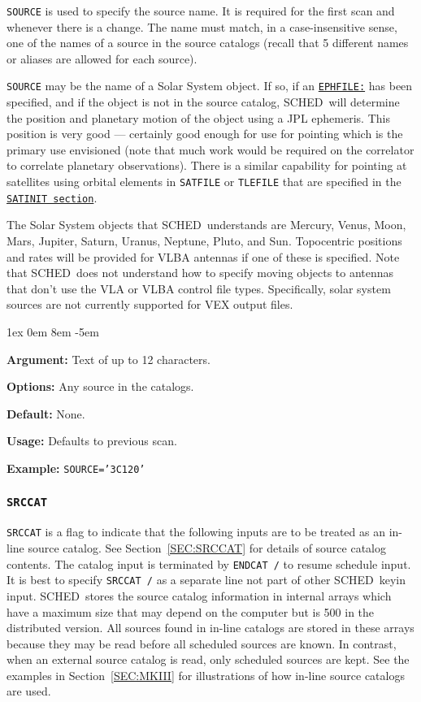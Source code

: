 \documentclass{report}
\newcommand{\schedb}{{\sc SCHED~}}
\newcommand{\rcwbox}[5]{
  \begin{list}{}{\parsep 1ex  \itemsep 0em
                 \leftmargin 8em  \itemindent -5em }
    \item {\bf Argument:} #1
    \item {\bf Options:}  #2
    \item {\bf Default:}  #3
    \item {\bf Usage:}    #4
    \item {\bf Example:}  #5
  \end{list}
}
\begin{document}
{\tt SOURCE} is used to specify the source name.  It is required for
the first scan and whenever there is a change. The name must match, in
a case-insensitive sense, one of the names of a source in the source
catalogs (recall that 5 different names or aliases are allowed for
each source).

{\tt SOURCE} may be the name of a Solar System object.  If so, if
an 
{\hyperref[MP:EPHFILE]{{\tt EPHFILE:}}} has been specified, and if the
object is not in the source catalog, \schedb will determine the position
and planetary motion of the object using a JPL ephemeris.  This position
is very good --- certainly good enough for use for pointing which
is the primary use envisioned (note that much work would be required
on the correlator to correlate planetary observations).  There is
a similar capability for pointing at satellites using orbital
elements in {\tt SATFILE} or {\tt TLEFILE} that are specified in the
{\hyperref[SEC:SATINIT]{{\tt SATINIT section}}}.

The Solar System objects that \schedb understands are Mercury, Venus,
Moon, Mars, Jupiter, Saturn, Uranus, Neptune, Pluto, and Sun.
Topocentric positions and rates will be provided for VLBA antennas if
one of these is specified.  Note
that \schedb does not understand how to specify moving objects to
antennas that don't use the VLA or VLBA control file types.
Specifically, solar system sources are not currently supported
for VEX output files.

\rcwbox
{Text of up to 12 characters.}
{Any source in the catalogs.}
{None.}
{Defaults to previous scan.}
{{\tt SOURCE='3C120'}}


\subsubsection{\label{MP:SRCCAT}{\tt SRCCAT}}

{\tt SRCCAT} is a flag to indicate that the following inputs are
to be treated as an in-line source catalog. See
Section~\ref{SEC:SRCCAT} for details of source catalog contents. The
catalog input is terminated by {\tt ENDCAT /} to resume schedule
input.  It is best to specify {\tt SRCCAT /} as a separate line not
part of other \schedb keyin input. \schedb stores the source
catalog information in internal arrays which have a maximum size that
may depend on the computer but is 500 in the distributed version. All
sources found in in-line catalogs are stored in these arrays because
they may be read before all scheduled sources are known. In contrast,
when an external source catalog is read, only scheduled sources are
kept. See the examples in Section~\ref{SEC:MKIII} for illustrations
of how in-line source catalogs are used.
\end{document}
